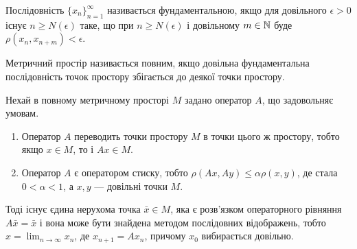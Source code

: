 \begin{definition} 
	Послідовність $\{x_n\}_{n=1}^\infty$ називається фундаментальною, як\-що для довільного $\epsilon > 0$ існує $n \ge N(\epsilon)$ таке, що при $n \ge N(\epsilon)$ і довільному $m\in\mathbb{N}$ буде $\rho(x_n,x_{n+m}) < \epsilon$.
\end{definition}

\begin{definition} 
	Метричний простір називається повним, якщо довільна фундаментальна послідовність точок простору збігається до деякої точки простору.
\end{definition}

\begin{theorem} 
	Нехай в повному метричному просторі $M$ задано оператор $A$, що задовольняє умовам.
	\begin{enumerate}
		\item Оператор $A$ переводить точки простору $M$ в точки цього ж простору, тобто якщо $x\in M$, то і $Ax \in M$.
		\item Оператор $A$ є оператором стиску, тобто $\rho(Ax,Ay)\le\alpha\rho(x,y)$, де стала $0 < \alpha < 1$, а $x,y$ --- довільні точки $M$. 
	\end{enumerate}

	Тоді існує єдина нерухома точка $\bar x \in M$, яка є розв'язком операторного рівняння $A\bar x=\bar x$ і вона може бути знайдена методом послідовних відображень, тобто $x = \lim_{n\to\infty} x_n$, де $x_{n+1} = A x_n$, причому $x_0$ вибирається довільно.
\end{theorem}

